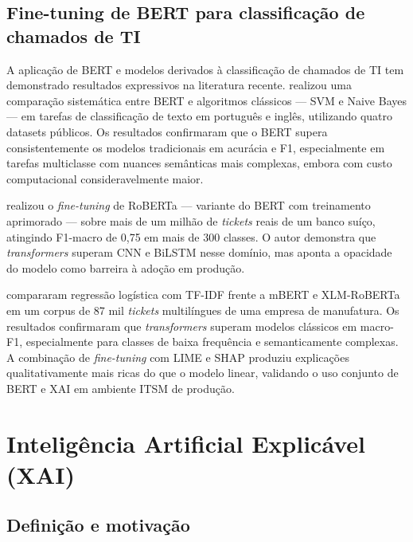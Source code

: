 \documentclass[
    12pt,                %
    openright,           %
    oneside,             %
    a4paper,             %
    english,             %
    brazil               %
]{abntex2}
\begin{document}
\subsection{Fine-tuning de BERT para classificação de chamados de TI}
\label{subsec:bert_tickets}

A aplicação de BERT e modelos derivados à classificação de chamados de TI tem demonstrado resultados expressivos na literatura recente.  realizou uma comparação sistemática entre BERT e algoritmos clássicos — SVM e Naive Bayes — em tarefas de classificação de texto em português e inglês, utilizando quatro datasets públicos. Os resultados confirmaram que o BERT supera consistentemente os modelos tradicionais em acurácia e F1, especialmente em tarefas multiclasse com nuances semânticas mais complexas, embora com custo computacional consideravelmente maior.

 realizou o \textit{fine-tuning} de RoBERTa — variante do BERT com treinamento aprimorado — sobre mais de um milhão de \textit{tickets} reais de um banco suíço, atingindo F1-macro de 0,75 em mais de 300 classes. O autor demonstra que \textit{transformers} superam CNN e BiLSTM nesse domínio, mas aponta a opacidade do modelo como barreira à adoção em produção.

 compararam regressão logística com TF-IDF frente a mBERT e XLM-RoBERTa em um corpus de 87 mil \textit{tickets} multilíngues de uma empresa de manufatura. Os resultados confirmaram que \textit{transformers} superam modelos clássicos em macro-F1, especialmente para classes de baixa frequência e semanticamente complexas. A combinação de \textit{fine-tuning} com LIME e SHAP produziu explicações qualitativamente mais ricas do que o modelo linear, validando o uso conjunto de BERT e XAI em ambiente ITSM de produção.

\section{Inteligência Artificial Explicável (XAI)}
\label{sec:xai}

\subsection{Definição e motivação}
\label{subsec:xai_definicao}
\end{document}
